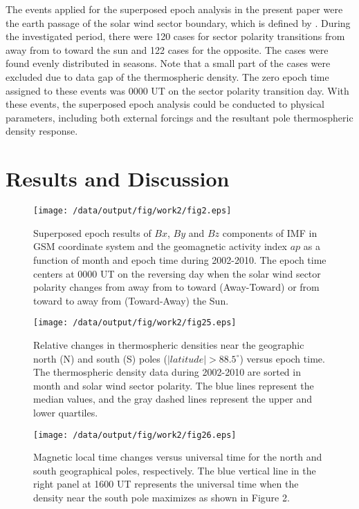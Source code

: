 \documentclass[draft,grl]{/home/gdj/文档/template/agu_template/AGUTeX}
\begin{document}
\begin{article}
    The events applied for the superposed epoch analysis in the present paper were the earth passage of the solar 
    wind sector boundary, which is defined by \citet{Svalgaard1976}.
    During the investigated period, there were 120 cases for sector polarity transitions from away from to 
    toward the sun and 122 cases for the opposite.
    The cases were found evenly distributed in seasons.
    Note that a small part of the cases were excluded due to data gap of the thermospheric density.
    The zero epoch time assigned to these events was 0000 UT on the sector polarity transition day.
    With these events, the superposed epoch analysis could be conducted to physical parameters, including 
    both external forcings and the resultant pole thermospheric density response.

\section{Results and Discussion}
    



\end{article}
\begin{figure}
    \centering
    \noindent\texttt{[image: /data/output/fig/work2/fig2.eps]}
    \caption{Superposed epoch results of $Bx$, $By$ and $Bz$ components of IMF in GSM coordinate system and the geomagnetic activity index $ap$ as a function of month and epoch time during 2002-2010. The epoch time centers at 0000 UT on the reversing day when the solar wind sector polarity changes from away from to toward (Away-Toward) or from toward to away from (Toward-Away) the Sun. }
    \label{figure1}
\end{figure}
\begin{figure}
    \centering
    \noindent\texttt{[image: /data/output/fig/work2/fig25.eps]}
    \caption{Relative changes in thermospheric densities near the geographic north (N) and south (S) poles ($\left|latitude\right| > 88.5^\circ$) versus epoch time. The thermospheric density data during 2002-2010 are sorted in month and solar wind sector polarity. The blue lines represent the median values, and the gray dashed lines represent the upper and lower quartiles.}
    \label{figure2}
\end{figure}
\begin{figure}
    \centering
    \noindent\texttt{[image: /data/output/fig/work2/fig26.eps]}
    \caption{ Magnetic local time changes versus universal time for the north and south geographical poles, respectively. The blue vertical line in the right panel at 1600 UT represents the universal time when the density near the south pole maximizes as shown in Figure 2.}
    \label{figure3}
\end{figure}
\end{document}
